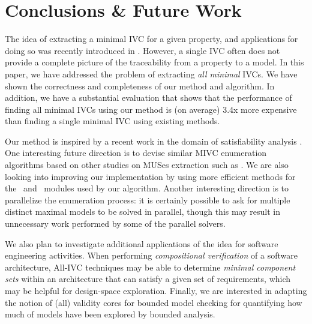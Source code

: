 \section{Conclusions \& Future Work}
\label{sec:conc}
The idea of extracting a minimal IVC for a given property, and applications for doing so was recently introduced in \cite{Ghass16}.  However, a single IVC often does not provide a complete picture of the traceability from a property to a model.  In this paper, we have addressed the problem of extracting {\em all minimal} IVCs. We have shown
the correctness and completeness of our method and algorithm.  In addition, we have a substantial evaluation that shows that the performance of finding all minimal IVCs using our method is (on average) 3.4x more expensive than finding a single minimal IVC using existing methods.

Our method is inspired by a recent work in the domain of satisfiability analysis \cite{marco2016fast}. One interesting future direction is to devise similar MIVC enumeration algorithms based on other studies on MUSes extraction such as \cite{Bacchus2016, nadel2014accelerated}.  We are also looking into improving our implementation by using more  efficient methods for the \isadeq ~and \getivc ~modules used by our algorithm. Another interesting direction is to parallelize the enumeration process: it is certainly possible to ask for multiple distinct maximal models to be solved in parallel, though this may result in unnecessary work performed by some of the parallel solvers.

We also plan to investigate additional applications of the idea for software engineering activities.  When performing {\em compositional verification} of a software architecture, All-IVC techniques may be able to determine {\em minimal component sets} within an architecture that can satisfy a given set of requirements, which may be helpful for design-space exploration.
%
Finally, we are interested in adapting the notion of (all) validity cores for bounded model checking for quantifying how much of models have been explored by bounded analysis. 